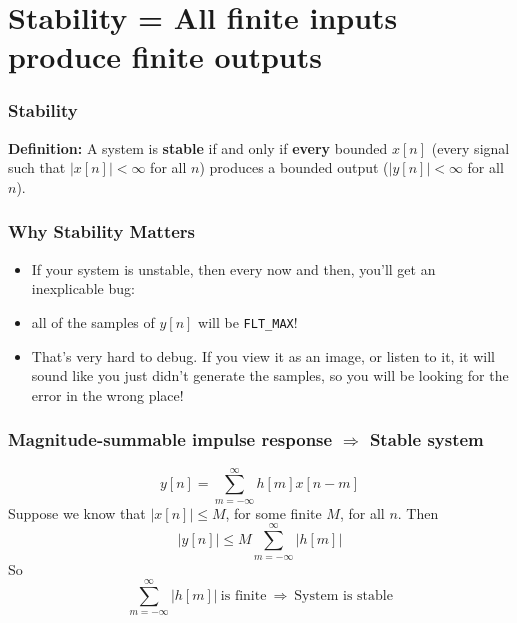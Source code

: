 \documentclass{beamer}
\begin{document}
\section[Stability]{Stability = All finite inputs produce finite outputs}
\setcounter{subsection}{1}

\begin{frame}
  \frametitle{Stability}

  {\bf Definition:} A system is {\bf stable} if and only if {\bf every}
  bounded $x[n]$ (every signal such that $|x[n]|<\infty$ for all $n$) produces a bounded output
  ($|y[n]|<\infty$ for all $n$).
\end{frame}

\begin{frame}
  \frametitle{Why Stability Matters}

  \begin{itemize}
  \item If your system is unstable, then every now and then, you'll
    get an inexplicable bug:
  \item all of the samples of $y[n]$ will be {\tt FLT\_MAX}!
  \item That's very hard to debug.  If you view it as an image, or
    listen to it, it will sound like you just didn't generate the
    samples, so you will be looking for the error in the wrong place!
  \end{itemize}
    
\end{frame}

\begin{frame}
  \frametitle{Magnitude-summable impulse response $\Rightarrow$ Stable system}

  \begin{displaymath}
    y[n] = \sum_{m=-\infty}^\infty h[m] x[n-m]
  \end{displaymath}
  Suppose we know that $|x[n]|\le M$, for some finite $M$, for all $n$.  Then
  \begin{displaymath}
    |y[n]| \le  M \sum_{m=-\infty}^\infty |h[m]|
  \end{displaymath}
  So
  \begin{displaymath}
    \sum_{m=-\infty}^\infty |h[m]|~\mbox{is finite}~\Rightarrow~\mbox{System is stable}
  \end{displaymath}
\end{frame}
\end{document}
